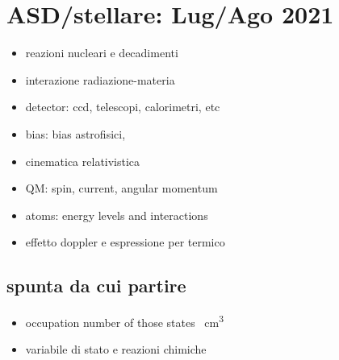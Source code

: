 \documentclass[main.tex]{subfiles}
\begin{document}
\part{ASD/stellare: Lug/Ago 2021}

\begin{itemize}
    \item reazioni nucleari e decadimenti
    \item interazione radiazione-materia
    \item detector: ccd, telescopi, calorimetri, etc
    \item bias: bias astrofisici,
    \item cinematica relativistica
    \item QM: spin, current, angular momentum
    \item atoms: energy levels and interactions
\item effetto doppler e espressione per termico

\end{itemize}

\chapter{spunta da cui partire}
\begin{itemize}
\item occupation number of those states \si{\per\cubic\cm}
\item variabile di stato e reazioni chimiche
\end{itemize}
\end{document}
